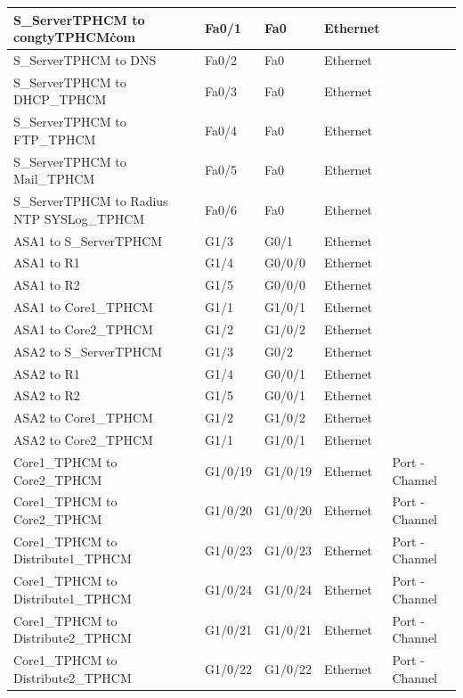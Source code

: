 \documentclass[12pt,a4paper]{report}
\begin{document}
\begin{center}
\begin{longtable}{|p{}|p{}|p{}|p{}|p{}|}
\hline  S\_ServerTPHCM  to  congtyTPHCM\.com  &  Fa0/1  &  Fa0  &  Ethernet  &   \\
\hline  S\_ServerTPHCM  to  DNS  &  Fa0/2  &  Fa0  &  Ethernet  &   \\
\hline  S\_ServerTPHCM  to  DHCP\_TPHCM  &  Fa0/3  &  Fa0  &  Ethernet  &   \\
\hline  S\_ServerTPHCM  to  FTP\_TPHCM  &  Fa0/4  &  Fa0  &  Ethernet  &   \\
\hline  S\_ServerTPHCM  to  Mail\_TPHCM  &  Fa0/5  &  Fa0  &  Ethernet  &   \\
\hline  S\_ServerTPHCM  to  Radius NTP SYSLog\_TPHCM  &  Fa0/6  &  Fa0  &  Ethernet  &   \\
\hline  ASA1  to  S\_ServerTPHCM  &  G1/3  &  G0/1  &  Ethernet  &   \\
\hline  ASA1  to  R1  &  G1/4  &  G0/0/0  &  Ethernet  &   \\
\hline  ASA1  to  R2  &  G1/5  &  G0/0/0  &  Ethernet  &   \\
\hline  ASA1  to  Core1\_TPHCM  &  G1/1  &  G1/0/1  &  Ethernet  &   \\
\hline  ASA1  to  Core2\_TPHCM  &  G1/2  &  G1/0/2  &  Ethernet  &   \\
\hline  ASA2  to  S\_ServerTPHCM  &  G1/3  &  G0/2  &  Ethernet  &   \\
\hline  ASA2  to  R1  &  G1/4  &  G0/0/1  &  Ethernet  &   \\
\hline  ASA2  to  R2  &  G1/5  &  G0/0/1  &  Ethernet  &   \\
\hline  ASA2  to  Core1\_TPHCM  &  G1/2  &  G1/0/2  &  Ethernet  &   \\
\hline  ASA2  to  Core2\_TPHCM  &  G1/1  &  G1/0/1  &  Ethernet  &   \\
\hline  Core1\_TPHCM  to  Core2\_TPHCM  &  G1/0/19  &  G1/0/19  &  Ethernet  &  Port - Channel \\
\hline  Core1\_TPHCM  to  Core2\_TPHCM  &  G1/0/20  &  G1/0/20  &  Ethernet  &  Port - Channel \\
\hline  Core1\_TPHCM  to  Distribute1\_TPHCM  &  G1/0/23  &  G1/0/23  &  Ethernet  &  Port - Channel \\
\hline  Core1\_TPHCM  to  Distribute1\_TPHCM  &  G1/0/24  &  G1/0/24  &  Ethernet  &  Port - Channel \\
\hline  Core1\_TPHCM  to  Distribute2\_TPHCM  &  G1/0/21  &  G1/0/21  &  Ethernet  &  Port - Channel \\
\hline  Core1\_TPHCM  to  Distribute2\_TPHCM  &  G1/0/22  &  G1/0/22  &  Ethernet  &  Port - Channel \\

\end{longtable}
\end{center}
\end{document}
